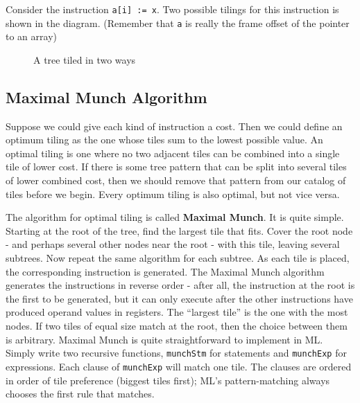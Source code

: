 Consider the instruction
\texttt{a[i] := x}.
Two possible tilings for this instruction is shown in the diagram.
(Remember that
\texttt{a} is
really the frame offset of the pointer to an array)

\begin{figure}
\centering
{}
\caption{A tree tiled in two ways}
\end{figure}

\hypertarget{maximal-munch-algorithm}{%
\subsection{Maximal Munch Algorithm}\label{maximal-munch-algorithm}}

Suppose we could give each kind of instruction a cost. Then we could
define an optimum tiling as the one whose tiles sum to the lowest
possible value. An optimal tiling is one where no two adjacent tiles can
be combined into a single tile of lower cost. If there is some tree
pattern that can be split into several tiles of lower combined cost,
then we should remove that pattern from our catalog of tiles before we
begin. Every optimum tiling is also optimal, but not vice versa.

The algorithm for optimal tiling is called \textbf{Maximal Munch}. It is
quite simple. Starting at the root of the tree, find the largest tile
that fits. Cover the root node - and perhaps several other nodes near
the root - with this tile, leaving several subtrees. Now repeat the same
algorithm for each subtree. As each tile is placed, the corresponding
instruction is generated. The Maximal Munch algorithm generates the
instructions in reverse order - after all, the instruction at the root
is the first to be generated, but it can only execute after the other
instructions have produced operand values in registers. The ``largest
tile'' is the one with the most nodes. If two tiles of equal size match
at the root, then the choice between them is arbitrary. Maximal Munch is
quite straightforward to implement in ML. Simply write two recursive
functions,
\texttt{munchStm}
for statements and
\texttt{munchExp}
for expressions. Each clause of
\texttt{munchExp}
will match one tile. The clauses are ordered in order of tile preference
(biggest tiles first); ML's pattern-matching always chooses the first
rule that matches.

